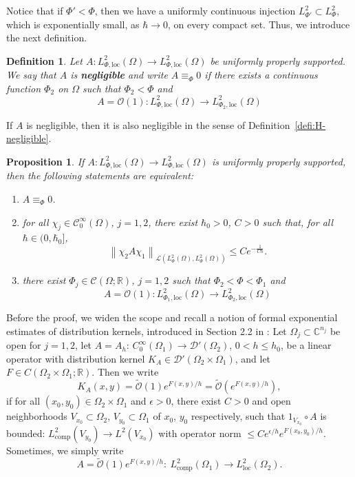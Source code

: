 \documentclass{article}
\newtheorem{prop}[theo]{Proposition}
\newtheorem{defi}[theo]{Definition}
\newcommand{\loc}{\mathrm{loc}}
\newcommand{\norm}[1]{\left\|#1\right\|}
\newcommand{\Cinf}{\mathscr{C}^\infty}
\newcommand{\RM}{\mathbb{R}}
\newcommand{\CM}{\mathbb{C}}
\newcommand{\h}{\hbar}
\begin{document}
Notice that if $\Phi'<\Phi$, then we have a uniformly continuous
injection $L^2_{\Phi'}\subset L^2_\Phi$, which is exponentially small,
as $\h\to 0$, on every compact set. Thus, we introduce the next
definition.
\begin{defi}\label{defi:negligible}
  Let $A:L_{ \Phi,\loc}^{2}(\Omega) \to L_{ \Phi,\loc}^{2}(\Omega)$ be
  uniformly properly supported. We say that $A$ is \textbf{negligible}
  and write $A\equiv_\Phi 0$ if there exists a continuous function $\Phi_2$
  on $\Omega$ such that $\Phi_2<\Phi$ and
  \[
  A = \mathcal{O}(1) : L_{ \Phi,\loc}^{2}(\Omega) \to L_{
    \Phi_2,\loc}^{2}(\Omega)
  \]
\end{defi}
If $A$ is negligible, then it is also negligible in the sense of
Definition~\ref{defi:H-negligible}.
\begin{prop}
  \label{prop:negligible}
  If $A:L_{ \Phi,\loc}^{2}(\Omega) \to L_{ \Phi,\loc}^{2}(\Omega)$ is
  uniformly properly supported, then the following statements are
  equivalent:
  \begin{enumerate}%
  \item \label{item:negl-1} $A\equiv_\Phi 0$.
  \item \label{item:negl-2} for all $\chi_j\in\Cinf_0(\Omega)$,
    $j=1,2$, there exist $\h_0>0$, $C>0$ such that, for all
    $\h\in(0,\h_0]$,
    \[
    \norm{\chi_2 A \chi_1}_{\mathcal{L}(L^2_{\Phi}(\Omega),
      L^2_{\Phi}(\Omega))} \leq C e^{-\frac{1}{C\h}}.
    \]
  \item \label{item:negl-3} there exist
    $\Phi_j\in \mathscr{C}(\Omega;\RM)$, $j=1,2$ such that
    $\Phi_2<\Phi<\Phi_1$ and
    \[
    A = \mathcal{O}(1) : L_{ \Phi_1,\loc}^{2}(\Omega) \to L_{
      \Phi_2,\loc}^{2}(\Omega)
    \]
  \end{enumerate}
\end{prop}
Before the proof, we widen the scope and recall a notion of formal
exponential estimates of distribution kernels, introduced in Section
2.2 in \cite{HeSj85}: Let $\Omega _j\subset \CM^{n_j}$ be open for
$j=1,2$, let
$A=A_h:\, C_0^\infty (\Omega _1)\to \mathcal{ D}'(\Omega _2)$,
$0<h\le h_0$, be a linear operator with distribution kernel
$K_A\in \mathcal{ D}'(\Omega _2\times \Omega _1)$, and let
$F\in C(\Omega _2\times \Omega _1;\RM)$. Then we write
\begin{equation}\label{pf.1}
  K_A(x,y)=\widetilde{\mathcal{ O}}(1)e^{F(x,y)/h}=\widetilde{\mathcal{ O}}(e^{F(x,y)/h}),
\end{equation}
if for all $(x_0,y_0)\in \Omega _2\times \Omega _1$ and $\epsilon >0$,
there exist $C>0$ and open neighborhoods $V_{x_0}\subset \Omega _2$,
$V_{y_0}\subset \Omega _1$ of $x_0$, $y_0$ respectively, such that
$1_{V_{x_0}}\circ A$ is bounded:
$L^2_{\mathrm{comp}}(V_{y_0})\to L^2(V_{x_0}) $ with operator norm
$\le Ce^{\epsilon /h}e^{F(x_0,y_0)/h}$. Sometimes, we simply write
\begin{equation}\label{pf.2}
  A=\widetilde{\mathcal{ O}}(1)e^{F(x,y)/h}:\ L^2_{\mathrm{comp}}(\Omega
  _1)\to L^2_{\mathrm{loc}}(\Omega _2).
\end{equation}
\end{document}
